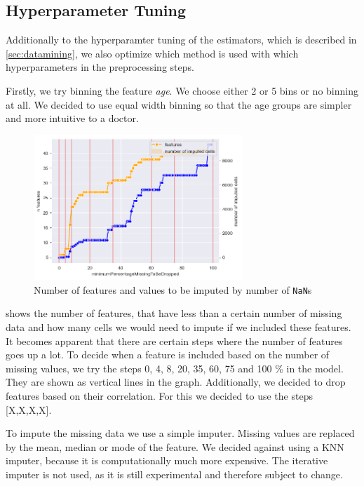 \subsection{Hyperparameter Tuning} \label{subsec:hyperparametertuning}
Additionally to the hyperparamter tuning of the estimators, which is described in \cref{sec:datamining}, we also optimize which method is used with which hyperparameters in the preprocessing steps.

Firstly, we try binning the feature \emph{age}. We choose either 2 or 5 bins or no binning at all. We decided to use equal width binning so that the age groups are simpler and more intuitive to a doctor.

\begin{figure}[h]
	\centering
	\includegraphics[width=0.7\textwidth]{images/percentageToBeDropped.png}
	\caption{Number of features and values to be imputed by number of \texttt{NaN}s}
	\label{fig:percentageToBeDropped}
\end{figure}

  shows the number of features, that have less than a certain number of missing data and how many cells we would need to impute if we included these features. It becomes apparent that there are certain steps where the number of features goes up a lot. To decide when a feature is included based on the number of missing values, we try the steps 0, 4, 8, 20, 35, 60, 75 and 100 \% in the model. They are shown as vertical lines in the graph.  Additionally, we decided to drop features based on their correlation. For this we decided to use the steps [X,X,X,X].

To impute the missing data we use a simple imputer. Missing values are replaced by the mean, median or mode of the feature. We decided against using a KNN imputer, because it is computationally much more expensive. The iterative imputer is not used, as it is still experimental and therefore subject to change.

